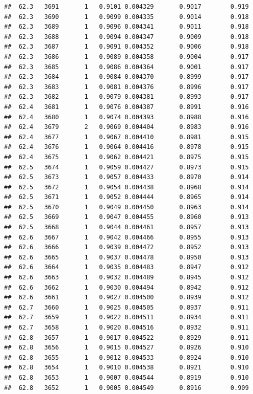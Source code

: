\documentclass[
]{book}
\begin{document}
\begin{verbatim}
##  62.3   3691       1   0.9101 0.004329       0.9017        0.919
##  62.3   3690       1   0.9099 0.004335       0.9014        0.918
##  62.3   3689       1   0.9096 0.004341       0.9011        0.918
##  62.3   3688       1   0.9094 0.004347       0.9009        0.918
##  62.3   3687       1   0.9091 0.004352       0.9006        0.918
##  62.3   3686       1   0.9089 0.004358       0.9004        0.917
##  62.3   3685       1   0.9086 0.004364       0.9001        0.917
##  62.3   3684       1   0.9084 0.004370       0.8999        0.917
##  62.3   3683       1   0.9081 0.004376       0.8996        0.917
##  62.3   3682       1   0.9079 0.004381       0.8993        0.917
##  62.4   3681       1   0.9076 0.004387       0.8991        0.916
##  62.4   3680       1   0.9074 0.004393       0.8988        0.916
##  62.4   3679       2   0.9069 0.004404       0.8983        0.916
##  62.4   3677       1   0.9067 0.004410       0.8981        0.915
##  62.4   3676       1   0.9064 0.004416       0.8978        0.915
##  62.4   3675       1   0.9062 0.004421       0.8975        0.915
##  62.5   3674       1   0.9059 0.004427       0.8973        0.915
##  62.5   3673       1   0.9057 0.004433       0.8970        0.914
##  62.5   3672       1   0.9054 0.004438       0.8968        0.914
##  62.5   3671       1   0.9052 0.004444       0.8965        0.914
##  62.5   3670       1   0.9049 0.004450       0.8963        0.914
##  62.5   3669       1   0.9047 0.004455       0.8960        0.913
##  62.5   3668       1   0.9044 0.004461       0.8957        0.913
##  62.6   3667       1   0.9042 0.004466       0.8955        0.913
##  62.6   3666       1   0.9039 0.004472       0.8952        0.913
##  62.6   3665       1   0.9037 0.004478       0.8950        0.913
##  62.6   3664       1   0.9035 0.004483       0.8947        0.912
##  62.6   3663       1   0.9032 0.004489       0.8945        0.912
##  62.6   3662       1   0.9030 0.004494       0.8942        0.912
##  62.6   3661       1   0.9027 0.004500       0.8939        0.912
##  62.7   3660       1   0.9025 0.004505       0.8937        0.911
##  62.7   3659       1   0.9022 0.004511       0.8934        0.911
##  62.7   3658       1   0.9020 0.004516       0.8932        0.911
##  62.8   3657       1   0.9017 0.004522       0.8929        0.911
##  62.8   3656       1   0.9015 0.004527       0.8926        0.910
##  62.8   3655       1   0.9012 0.004533       0.8924        0.910
##  62.8   3654       1   0.9010 0.004538       0.8921        0.910
##  62.8   3653       1   0.9007 0.004544       0.8919        0.910
##  62.8   3652       1   0.9005 0.004549       0.8916        0.909

\end{verbatim}
\end{document}
